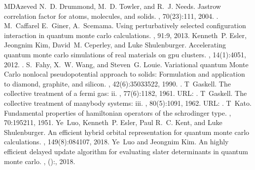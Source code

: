\documentclass[letterpaper,10pt,english]{sphinxmanual}
\begin{document}
\begin{sphinxthebibliography}{MDAzeved}
N. D. Drummond, M. D. Towler, and R. J. Needs. Jastrow correlation factor for atoms, molecules, and solids. , 70(23):1\textendash{}11, 2004. .
M. Caffarel E. Giner, A. Scemama. Using perturbatively selected configuration interaction in quantum monte carlo calculations. , 91:9, 2013.
Kenneth P. Esler, Jeongnim Kim, David M. Ceperley, and Luke Shulenburger. Accelerating quantum monte carlo simulations of real materials on gpu clusters. , 14(1):40\textendash{}51, 2012. .
S. Fahy, X. W. Wang, and Steven G. Louie. Variational quantum Monte Carlo nonlocal pseudopotential approach to solids: Formulation and application to diamond, graphite, and silicon. , 42(6):3503\textendash{}3522, 1990. .
T Gaskell. The collective treatment of a fermi gas: ii. , 77(6):1182, 1961. URL: .
T Gaskell. The collective treatment of many\sphinxhyphen{}body systems: iii. , 80(5):1091, 1962. URL: .
T Kato. Fundamental properties of hamiltonian operators of the schrodinger type. , 70:195\textendash{}211, 1951.
Ye Luo, Kenneth P. Esler, Paul R. C. Kent, and Luke Shulenburger. An efficient hybrid orbital representation for quantum monte carlo calculations. , 149(8):084107, 2018.
Ye Luo and Jeongnim Kim. An highly efficient delayed update algorithm for evaluating slater determinants in quantum monte carlo. , ():, 2018.

\end{sphinxthebibliography}
\end{document}
